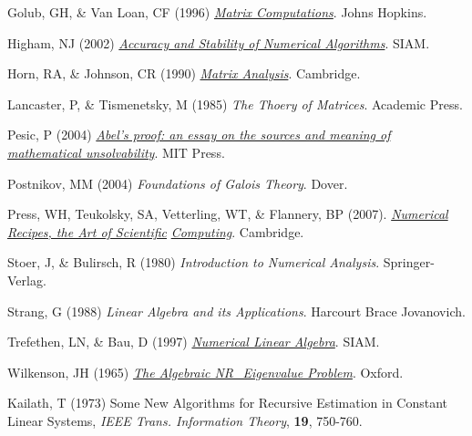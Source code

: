\noindent Golub, GH, \& Van Loan, CF (1996) \href{http://books.google.com/books?id=mlOa7wPX6OYC&printsec=frontcover}{\it Matrix Computations}. Johns Hopkins.\vskip0.1in

\noindent Higham, NJ (2002) \href{http://books.google.com/books?id=epilvM5MMxwC&printsec=frontcover}{\it Accuracy and Stability of Numerical Algorithms}.  SIAM.\vskip0.1in

\noindent Horn, RA, \& Johnson, CR (1990) \href{http://books.google.com/books?id=9wTacOjHE6IC&printsec=frontcover}{\it Matrix Analysis}.  Cambridge.\vskip0.1in

\noindent Lancaster, P, \& Tismenetsky, M (1985) {\it The Thoery of Matrices}.  Academic Press.\vskip0.1in

\noindent Pesic, P (2004) \href{http://books.google.com/books?id=nIpGp9Y5AlEC&printsec=frontcover}{\it Abel's proof:
an essay on the sources and meaning of mathematical unsolvability}.  MIT Press.

\noindent Postnikov, MM (2004) {\it Foundations of Galois Theory}. Dover.\vskip0.1in

\noindent Press, WH, Teukolsky, SA, Vetterling, WT, \& Flannery, BP (2007). \href{http://www.nr.com/}{\it Numerical Recipes, the Art of Scientific}
\href{http://www.nr.com/}{\it Computing}. Cambridge.\vskip0.1in

\noindent Stoer, J, \& Bulirsch, R (1980) {\it Introduction to Numerical Analysis}.  Springer-Verlag.\vskip0.1in

\noindent Strang, G (1988) {\it Linear Algebra and its Applications}.  Harcourt Brace Jovanovich.\vskip0.1in

\noindent Trefethen, LN, \& Bau, D (1997) \href{http://books.google.com/books?id=bj-Lu6zjWbEC&printsec=frontcover}{\it Numerical Linear Algebra}.  SIAM.\vskip0.1in

\noindent Wilkenson, JH (1965) \href{http://books.google.com/books?id=5wsK1OP7UFgC&printsec=frontcover}{\it The Algebraic NR_Eigenvalue Problem}.  Oxford.\vskip0.1in

\noindent Kailath, T (1973) Some New Algorithms for Recursive Estimation in Constant Linear Systems, {\it IEEE Trans. Information Theory}, {\bf 19}, 750-760.
